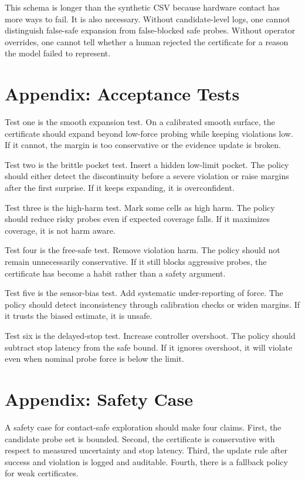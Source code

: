 \documentclass{article}
\begin{document}
This schema is longer than the synthetic CSV because hardware contact has more
ways to fail. It is also necessary. Without candidate-level logs, one cannot
distinguish false-safe expansion from false-blocked safe probes. Without
operator overrides, one cannot tell whether a human rejected the certificate
for a reason the model failed to represent.

\section{Appendix: Acceptance Tests}

Test one is the smooth expansion test. On a calibrated smooth surface, the
certificate should expand beyond low-force probing while keeping violations
low. If it cannot, the margin is too conservative or the evidence update is
broken.

Test two is the brittle pocket test. Insert a hidden low-limit pocket. The
policy should either detect the discontinuity before a severe violation or
raise margins after the first surprise. If it keeps expanding, it is
overconfident.

Test three is the high-harm test. Mark some cells as high harm. The policy
should reduce risky probes even if expected coverage falls. If it maximizes
coverage, it is not harm aware.

Test four is the free-safe test. Remove violation harm. The policy should not
remain unnecessarily conservative. If it still blocks aggressive probes, the
certificate has become a habit rather than a safety argument.

Test five is the sensor-bias test. Add systematic under-reporting of force.
The policy should detect inconsistency through calibration checks or widen
margins. If it trusts the biased estimate, it is unsafe.

Test six is the delayed-stop test. Increase controller overshoot. The policy
should subtract stop latency from the safe bound. If it ignores overshoot, it
will violate even when nominal probe force is below the limit.

\section{Appendix: Safety Case}

A safety case for contact-safe exploration should make four claims. First, the
candidate probe set is bounded. Second, the certificate is conservative with
respect to measured uncertainty and stop latency. Third, the update rule after
success and violation is logged and auditable. Fourth, there is a fallback
policy for weak certificates.
\end{document}
